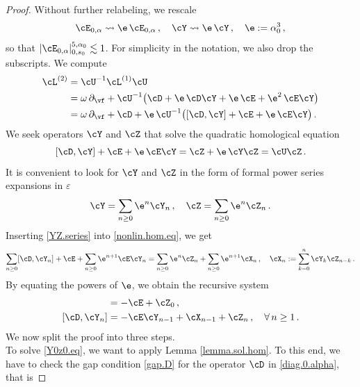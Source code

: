 \documentclass[a4paper,reqno,10pt]{article}
\newcommand{\pa}{\partial}
\begin{document}
\begin{proof}
	Without further relabeling, we rescale
	\begin{equation}\label{rescale}
		\cE_{0,\alpha} \rightsquigarrow \e \, \cE_{0,\alpha} \,, \quad  \cY \rightsquigarrow \e \, \cY \,, \quad \e := \alpha_{0}^3 \,,
	\end{equation}
	so that $|\cE_{0,\alpha}|_{0,{s_0}}^{5,\alpha_{0}}\lesssim 1$. For simplicity in the notation, we also drop the subscripts. We compute
	\begin{align}
		\cL^{(2)} & = \cU^{-1} \cL^{(1)} \cU \\
		& = \omega\,\pa_{\vf} + \cU^{-1}\big( \cD+ \e\, \cD \cY + \e \, \cE+ {\e^2} \, \cE\cY \big) \\
		& = \omega \,\pa_{\vf} + \cD+ \e \,\cU^{-1} \big(  [\cD,\cY]  +\cE+ \e \, \cE \cY \big)\,.
	\end{align}
	We seek  operators $\cY$ and $\cZ$ that solve the quadratic homological equation
	\begin{equation}\label{nonlin.hom.eq}
	[\cD,\cY]  +\cE+ \e \, \cE \cY = \cZ+ \e \, \cY \cZ=\cU\cZ\,.
	\end{equation}
	It is convenient to look for $\cY$ and $\cZ$ in the form of formal power series expansions in $\varepsilon$
	\begin{equation}\label{YZ.series}
		\cY = \sum_{n\geq 0} \e^n \cY_{n} \,, \quad \cZ= \sum_{n\geq 0} \e^n \cZ_{n} \,.
	\end{equation}
	Inserting \eqref{YZ.series} into \eqref{nonlin.hom.eq}, we get
	\begin{equation}
		\sum_{n\geq 0} [\cD,\cY_{n}] + \cE +  \sum_{n\geq 0} \e^{n+1} \cE \cY_{n} = \sum_{n\geq 0} \e^n \cZ_n +  \sum_{n\geq 0} \e^{n+1}\cX_{n} \,, \quad \cX_{n}:= \sum_{k=0}^{n} \cY_{k} \cZ_{n-k} \,.
	\end{equation}
	By equating the powers of $\e$, we obtain the recursive system
	\begin{align}
		[\cD,\cY_{0}] &= -\cE + \cZ_{0} \,, \label{Y0z0.eq} \\
		[\cD,\cY_{n}] & = - \cE \cY_{n-1} +\cX_{n-1} +\cZ_{n} \,, \quad \forall\, n\geq 1 \,. \label{YnZn.eq}
	\end{align}
	We now split the proof into three steps.
	\\[1mm]
	 To solve \eqref{Y0z0.eq}, we want to apply Lemma \ref{lemma.sol.hom}. To this end, we have to check the gap condition \eqref{gap.D} for the operator $\cD$ in \eqref{diag.0.alpha}, that is

\end{proof}
\end{document}
